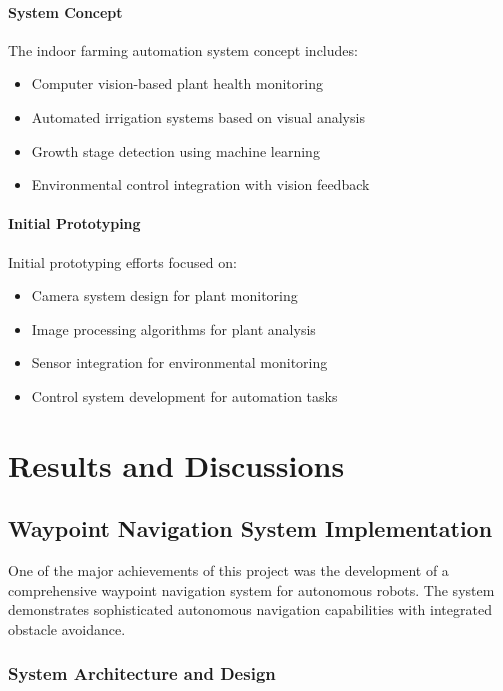 \documentclass{book}
\begin{document}
\subsubsection{System Concept}
\par\noindent The indoor farming automation system concept includes:

\begin{itemize}
\item Computer vision-based plant health monitoring
\item Automated irrigation systems based on visual analysis
\item Growth stage detection using machine learning
\item Environmental control integration with vision feedback
\end{itemize}

\subsubsection{Initial Prototyping}
\par\noindent Initial prototyping efforts focused on:

\begin{itemize}
\item Camera system design for plant monitoring
\item Image processing algorithms for plant analysis
\item Sensor integration for environmental monitoring
\item Control system development for automation tasks
\end{itemize}

\chapter{Results and Discussions}

\section{Waypoint Navigation System Implementation}

\par\noindent One of the major achievements of this project was the development of a comprehensive waypoint navigation system for autonomous robots. The system demonstrates sophisticated autonomous navigation capabilities with integrated obstacle avoidance.

\subsection{System Architecture and Design}
\end{document}
